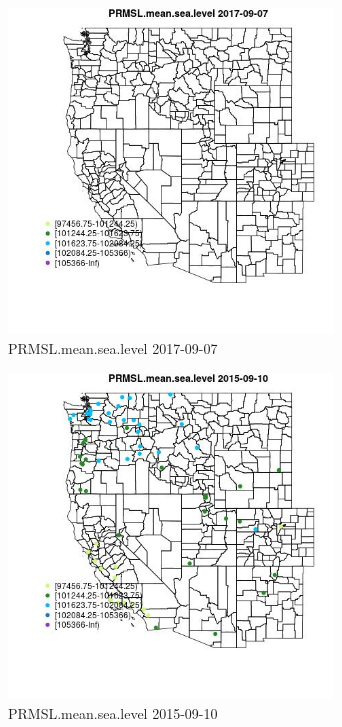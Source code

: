 \begin{figure} 
\centering  
\includegraphics[width=0.77\textwidth]{Code_Outputs/Report_ML_input_PM25_Step4_part_e_de_duplicated_aveswNAs_MapObsPRMSLmeansealevel2017-09-07.jpg} 
\caption{\label{fig:Report_ML_input_PM25_Step4_part_e_de_duplicated_aveswNAsMapObsPRMSLmeansealevel2017-09-07}PRMSL.mean.sea.level 2017-09-07} 
\end{figure} 
 

\begin{figure} 
\centering  
\includegraphics[width=0.77\textwidth]{Code_Outputs/Report_ML_input_PM25_Step4_part_e_de_duplicated_aveswNAs_MapObsPRMSLmeansealevel2015-09-10.jpg} 
\caption{\label{fig:Report_ML_input_PM25_Step4_part_e_de_duplicated_aveswNAsMapObsPRMSLmeansealevel2015-09-10}PRMSL.mean.sea.level 2015-09-10} 
\end{figure} 
 

